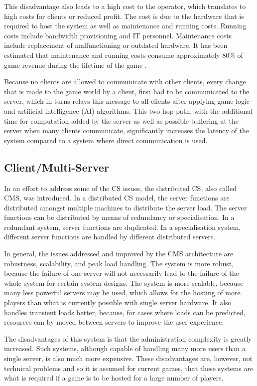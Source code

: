 \documentclass[10pt,a4paper,journal,cspaper,compsoc]{IEEEtran}
\begin{document}
This disadvantage also leads to a high cost to the operator, which translates to high costs for clients or reduced profit. The cost is due to the
hardware that is required to host the system as well as maintenance and running costs. Running costs include bandwidth provisioning and IT personnel.
Maintenance costs include replacement of malfunctioning or outdated hardware. It has been estimated that maintenance and running costs consume
approximately 80\% of game revenue during the lifetime of the game \cite{cs_mmog_cost}.

Because no clients are allowed to communicate with other clients, every change that is made to the game world by a client, first had to be
communicated to the server, which in turns relays this message to all clients after applying game logic and artificial intelligence (AI) algorithms.
This two hop path, with the additional time for computation added by the server as well as possible buffering at the server when many clients
communicate, significantly increases the latency of the system compared to a system where direct communication is used.

\subsection{Client/Multi-Server}
In an effort to address some of the \ac{CS} issues, the distributed \ac{CS}, also called \ac{CMS}, was introduced. In a distributed \ac{CS} model,
the server functions are distributed amongst multiple machines to distribute the server load. The server functions can be distributed by means of
redundancy or specialisation. In a redundant system, server functions are duplicated. In a specialisation system, different server functions are
handled by different distributed servers.

In general, the issues addressed and improved by the \ac{CMS} architecture are robustness, scalability, and peak load handling. The system is more
robust, because the failure of one server will not necessarily lead to the failure of the whole system for certain system designs. The system is more
scalable, because many less powerful servers may be used, which allows for the hosting of more players than what is currently possible with single
server hardware. It also handles transient loads better, because, for cases where loads can be predicted, resources can by moved between servers to
improve the user experience.

The disadvantages of this system is that the administration complexity is greatly increased. Such systems, although capable of handling many more
users than a single server, is also much more expensive. These disadvantages are, however, not technical problems and so it is assumed for current
games, that these systems are what is required if a game is to be hosted for a large number of players.
\end{document}
